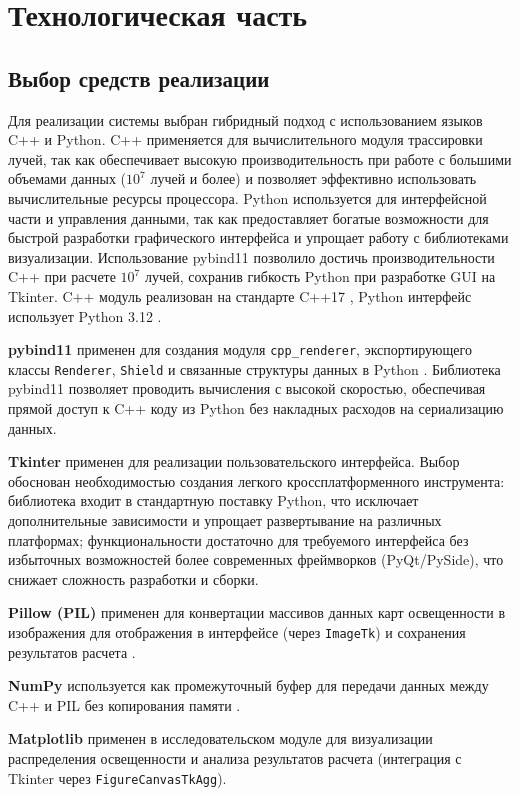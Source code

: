 \chapter{Технологическая часть}

\section{Выбор средств реализации}

Для реализации системы выбран гибридный подход с использованием языков C++ и Python. C++ применяется для вычислительного модуля трассировки лучей, так как обеспечивает высокую производительность при работе с большими объемами данных ($10^7$ лучей и более) и позволяет эффективно использовать вычислительные ресурсы процессора. Python используется для интерфейсной части и управления данными, так как предоставляет богатые возможности для быстрой разработки графического интерфейса и упрощает работу с библиотеками визуализации. Использование pybind11 позволило достичь производительности C++ при расчете $10^7$ лучей, сохранив гибкость Python при разработке GUI на Tkinter. C++ модуль реализован на стандарте C++17 \cite{11}, Python интерфейс использует Python 3.12 \cite{12}.

\textbf{pybind11} применен для создания модуля \texttt{cpp\_renderer}, экспортирующего классы \texttt{Renderer}, \texttt{Shield} и связанные структуры данных в Python \cite{13}. Библиотека pybind11 позволяет проводить вычисления с высокой скоростью, обеспечивая прямой доступ к C++ коду из Python без накладных расходов на сериализацию данных.

\textbf{Tkinter} применен для реализации пользовательского интерфейса. Выбор обоснован необходимостью создания легкого кроссплатформенного инструмента: библиотека входит в стандартную поставку Python, что исключает дополнительные зависимости и упрощает развертывание на различных платформах; функциональности достаточно для требуемого интерфейса без избыточных возможностей более современных фреймворков (PyQt/PySide), что снижает сложность разработки и сборки.

\textbf{Pillow (PIL)} применен для конвертации массивов данных карт освещенности в изображения для отображения в интерфейсе (через \texttt{ImageTk}) и сохранения результатов расчета \cite{15}.

\textbf{NumPy} используется как промежуточный буфер для передачи данных между C++ и PIL без копирования памяти \cite{14}.

\textbf{Matplotlib} применен в исследовательском модуле для визуализации распределения освещенности и анализа результатов расчета (интеграция с Tkinter через \texttt{FigureCanvasTkAgg}).

